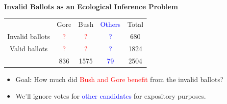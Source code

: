 \documentclass[landscape,letterpaper]{seminar}
\begin{document}
\begin{slide}
  \begin{center}
    \textbf{Invalid Ballots as an Ecological Inference Problem}
  \end{center}

\smallskip
\begin{center}
\small
\begin{table}
    \begin{tabular}{ccccc}
      & Gore  & Bush & \textcolor{Blue}{Others} & Total  \\
      \cline{2-4}
      Invalid ballots &   \textcolor{Red}{?}   &   \textcolor{Red}{?}  &   \textcolor{Blue}{?}    &  680   \\
      Valid ballots   &   \textcolor{Red}{?}   &   \textcolor{Red}{?}  &   \textcolor{Blue}{?}    & 1824   \\
      \cline{2-4}
      & 836   & 1575 &   \textcolor{Blue}{79}   & 2504   \\
    \end{tabular} 
\end{table} 
\end{center}

\begin{itemize}
\item Goal: How much did \textcolor{Red}{Bush and Gore benefit} from the invalid ballots?
\item We'll ignore votes for \textcolor{Blue}{other candidates} for expository purposes.
\end{itemize}

\end{slide}

\end{document}
